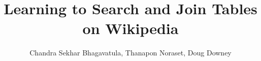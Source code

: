 \documentclass{sig-alternate}
\begin{document}
\sloppy
\conferenceinfo{}{}

\newcommand{\systemName}[0]{\emph{WikiTables}}
\newcommand{\systemNameHeader}[0]{WikiTables}
\newcommand{\columnRankingTaskName}[0]{\emph{relevant join}}
\newcommand{\tableSearchTaskName}[0]{\emph{table search}}
\newcommand{\columnRankingTaskNameHeader}[0]{Relevant Join}
\newcommand{\tableSearchTaskNameHeader}[0]{Table Search}
\newcommand*{\myfont}{\fontfamily{pzc}\selectfont}

\newcommand{\tableCorpus}[0]{\cal{T}}
\newcommand{\queryTable}[0]{\mathbf{T}_{q}}
\newcommand{\targetTable}[0]{\mathbf{T}_{t}}
\newcommand{\finalTable}[0]{\mathbf{T}_{f}}
\newcommand{\matchCorpus}[0]{\cal{M}}
\newcommand{\matchPerc}[0]{\emph{MatchPercent}}


\newcommand{\sourceCol}[0]{\mathbf{c}^{q}_{s}}
\newcommand{\matchedCol}[0]{\mathbf{c}^{t}_{m}}
\newcommand{\addableCol}[0]{\mathbf{c}^{t}_{c}}
\newcommand{\addedCol}[0]{\mathbf{c}^{t}_{a}}
\newcommand{\sarmaSys}[0]{\textsc{Rel\_Table}}
\newcommand{\ventisSys}[0]{\textsc{Table}}
\newcommand{\rjBaseline}[0]{\textsc{Base}}
\newcommand{\rjAblateSR}[0]{\emph{WikiTables$-$SR}}
\newcommand{\rjBest}[0]{\emph{WikiTables}}
\newcommand{\googft}[0]{\textsc{Google Fusion Tables}}
\newcommand{\venetisEtAl}[0]{Venetis et al.}
\newcommand{\sarmaEtAl}[0]{Sarma et al.}
\def\Section {\S}

\title{Learning to Search and Join Tables on Wikipedia} 

\author{\alignauthor Chandra Sekhar Bhagavatula, Thanapon Noraset, Doug Downey \\
 \\
} 

\maketitle









\end{document}

